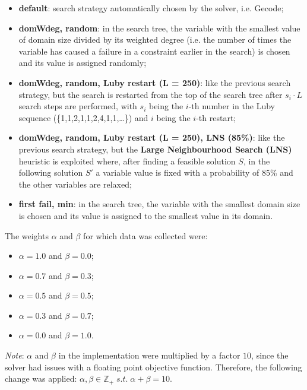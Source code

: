 \documentclass[../main.tex]{subfiles}
\begin{document}
\begin{itemize}
    \item \textbf{default}: search strategy automatically chosen by the solver, i.e. Gecode;
    \item \textbf{domWdeg, random}: in the search tree, the variable with the smallest value of domain size divided by its weighted degree (i.e. the number of times the variable has caused a failure in a constraint earlier in the search) is chosen and its value is assigned randomly;
    \item \textbf{domWdeg, random, Luby restart (L = 250)}: like the previous search strategy, but the search is restarted from the top of the search tree after $s_i \cdot L$ search steps are performed, with $s_i$ being the $i$-th number in the Luby sequence (\{1,1,2,1,1,2,4,1,1,\dots\}) and $i$ being the $i$-th restart;
    \item \textbf{domWdeg, random, Luby restart (L = 250), LNS (85\%)}: like the previous search strategy, but the \textbf{Large Neighbourhood Search (LNS)} heuristic is exploited where, after finding a feasible solution $S$, in the following solution $S'$ a variable value is fixed with a probability of 85\% and the other variables are relaxed;
    \item \textbf{first fail, min}: in the search tree, the variable with the smallest domain size is chosen and its value is assigned to the smallest value in its domain.
\end{itemize}
The weights $\alpha$ and $\beta$ for which data was collected were:
\begin{itemize}
    \item $\alpha = 1.0$ and $\beta = 0.0$;
    \item $\alpha = 0.7$ and $\beta = 0.3$;
    \item $\alpha = 0.5$ and $\beta = 0.5$;
    \item $\alpha = 0.3$ and $\beta = 0.7$;
    \item $\alpha = 0.0$ and $\beta = 1.0$.
\end{itemize}
\textit{Note}: $\alpha$ and $\beta$ in the implementation were multiplied by a factor $10$, since the solver had issues with a floating point objective function. Therefore, the following change was applied: $\alpha, \beta \in \mathbb{Z}_+ \; s.t.\; \alpha + \beta = 10$.














\end{document}
